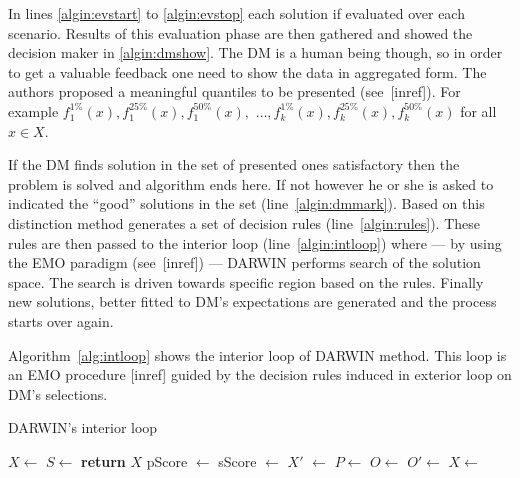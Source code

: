 In lines \ref{algin:evstart} to \ref{algin:evstop} each solution if evaluated
over each scenario. Results of this evaluation phase are then gathered and
showed the decision maker in \ref{algin:dmshow}. The DM is a human being
though, so in order to get a valuable feedback one need to show the data in
aggregated form. The authors proposed a meaningful quantiles to be presented
(see~[inref]). For example $f^{1\%}_1(x), f^{25\%}_1(x), f^{50\%}_1(x),$
$\dots, f^{1\%}_k(x), f^{25\%}_k(x), f^{50\%}_k(x)$ for all $x \in X$.

If the DM finds solution in the set of presented ones satisfactory then the
problem is solved and algorithm ends here. If not however he or she is asked
to indicated the ``good'' solutions in the set (line~\ref{algin:dmmark}).
Based on this distinction method generates a set of decision rules
(line~\ref{algin:rules}). These rules are then passed to the interior loop
(line~\ref{algin:intloop}) where --- by using the EMO paradigm (see~[inref])
--- DARWIN performs search of the solution space. The search is driven towards
specific region based on the rules. Finally new solutions, better fitted to
DM's expectations are generated and the process starts over again.

Algorithm~\ref{alg:intloop} shows the interior loop of DARWIN method. This
loop is an EMO procedure [inref] guided by the decision rules induced in
exterior loop on DM's selections.

\begin{algorithm}
\caption{DARWIN's interior loop}\label{alg:intloop}
  \begin{algorithmic}[1]
    \State $X \gets$  \label{algin:solgen-int}
    \State $S \gets$  \label{algin:scengen-int}
    \Loop \label{algin:evloop}
     \label{algin:evstart-int} 
    \State {}
    \EndFor{} \label{algin:evstop-int}
    \State \textbf{return} $X$
    \EndIf
    \State pScore $\gets$  \label{algin:ps}
    \State sScore $\gets$  \label{algin:ss}
    \State $X'$ $\gets$  \label{algin:rank}
    \State $P \gets$  \label{algin:select}
    \State $O \gets$  \label{algin:off}
    \State $O' \gets$  \label{algin:mut}
    \State $X \gets$  \label{algin:merge}
    \EndLoop
    \EndProcedure{}
  \end{algorithmic}
\end{algorithm}

